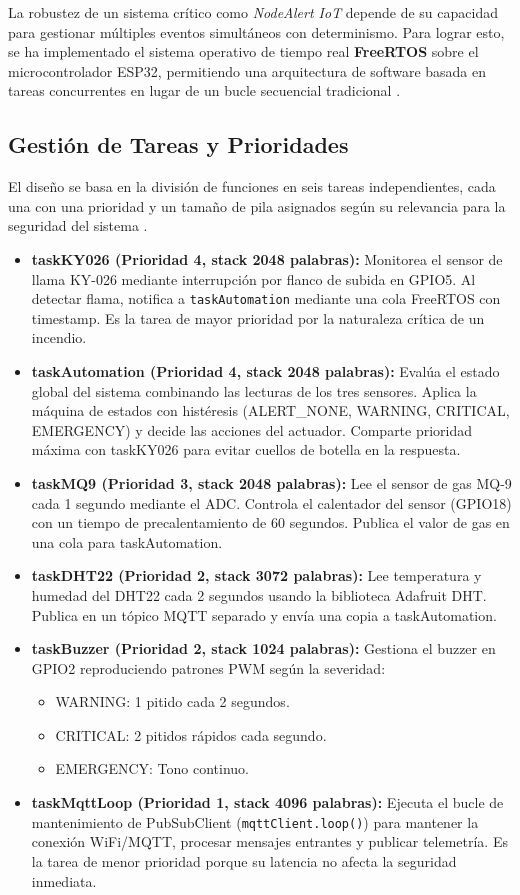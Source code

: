 
La robustez de un sistema crítico como \textit{NodeAlert IoT} depende de su capacidad para gestionar múltiples eventos simultáneos con determinismo. Para lograr esto, se ha implementado el sistema operativo de tiempo real \textbf{FreeRTOS} sobre el microcontrolador ESP32, permitiendo una arquitectura de software basada en tareas concurrentes en lugar de un bucle secuencial tradicional \citep{valvano2014volume1}.

\subsection{Gestión de Tareas y Prioridades}
El diseño se basa en la división de funciones en seis tareas independientes, cada una con una prioridad y un tamaño de pila asignados según su relevancia para la seguridad del sistema \citep{valvano2014volume2}.

\begin{itemize}
    \item \textbf{taskKY026 (Prioridad 4, stack 2048 palabras):} Monitorea el sensor de llama KY-026 mediante interrupción por flanco de subida en GPIO5. Al detectar flama, notifica a \texttt{taskAutomation} mediante una cola FreeRTOS con timestamp. Es la tarea de mayor prioridad por la naturaleza crítica de un incendio.
    \item \textbf{taskAutomation (Prioridad 4, stack 2048 palabras):} Evalúa el estado global del sistema combinando las lecturas de los tres sensores. Aplica la máquina de estados con histéresis (ALERT\_NONE, WARNING, CRITICAL, EMERGENCY) y decide las acciones del actuador. Comparte prioridad máxima con taskKY026 para evitar cuellos de botella en la respuesta.
    \item \textbf{taskMQ9 (Prioridad 3, stack 2048 palabras):} Lee el sensor de gas MQ-9 cada 1 segundo mediante el ADC. Controla el calentador del sensor (GPIO18) con un tiempo de precalentamiento de 60 segundos. Publica el valor de gas en una cola para taskAutomation.
    \item \textbf{taskDHT22 (Prioridad 2, stack 3072 palabras):} Lee temperatura y humedad del DHT22 cada 2 segundos usando la biblioteca Adafruit DHT. Publica en un tópico MQTT separado y envía una copia a taskAutomation.
    \item \textbf{taskBuzzer (Prioridad 2, stack 1024 palabras):} Gestiona el buzzer en GPIO2 reproduciendo patrones PWM según la severidad:
    \begin{itemize}
        \item WARNING: 1 pitido cada 2 segundos.
        \item CRITICAL: 2 pitidos r\'apidos cada segundo.
        \item EMERGENCY: Tono continuo.
    \end{itemize}
    \item \textbf{taskMqttLoop (Prioridad 1, stack 4096 palabras):} Ejecuta el bucle de mantenimiento de PubSubClient (\texttt{mqttClient.loop()}) para mantener la conexión WiFi/MQTT, procesar mensajes entrantes y publicar telemetría. Es la tarea de menor prioridad porque su latencia no afecta la seguridad inmediata.
\end{itemize}

